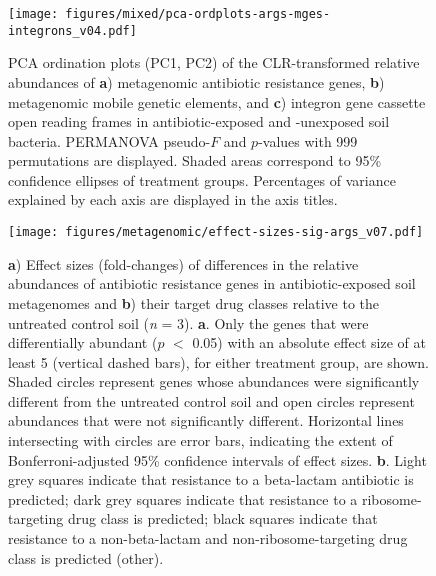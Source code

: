 \begin{figure}[htpb]
	\centering
		\texttt{[image: figures/mixed/pca-ordplots-args-mges-integrons\_v04.pdf]}
	\caption[PCA ordination plots (PC1, PC2) of the CLR-transformed relative abundances of \textbf{a}) metagenomic antibiotic resistance genes, \textbf{b}) metagenomic mobile genetic elements, and \textbf{c}) integron gene cassette open reading frames in antibiotic-exposed and -unexposed soil bacteria.]{
		PCA ordination plots (PC1, PC2) of the CLR-transformed relative abundances of \textbf{a}) metagenomic antibiotic resistance genes, \textbf{b}) metagenomic mobile genetic elements, and \textbf{c}) integron gene cassette open reading frames in antibiotic-exposed and -unexposed soil bacteria.
		PERMANOVA pseudo-$F$ and $p$-values with 999 permutations are displayed.
		Shaded areas correspond to 95\% confidence ellipses of treatment groups.
		Percentages of variance explained by each axis are displayed in the axis titles.
	}
	\label{fig:pca-ordplots-args-mges-integrons}
\end{figure}

\begin{figure}[htpb]
	\centering
		\texttt{[image: figures/metagenomic/effect-sizes-sig-args\_v07.pdf]}
	\caption[\textbf{a}) Effect sizes (fold-changes) of differences in the relative abundances of antibiotic resistance genes in antibiotic-exposed soil metagenomes and \textbf{b}) their target drug classes relative to the untreated control soil (\textit{n} = 3).]{
		\textbf{a}) Effect sizes (fold-changes) of differences in the relative abundances of antibiotic resistance genes in antibiotic-exposed soil metagenomes and \textbf{b}) their target drug classes relative to the untreated control soil (\textit{n} = 3).
		\textbf{a}. Only the genes that were differentially abundant ($p$ $<$ 0.05) with an absolute effect size of at least 5 (vertical dashed bars), for either treatment group, are shown.
		Shaded circles represent genes whose abundances were significantly different from the untreated control soil and open circles represent abundances that were not significantly different.
		Horizontal lines intersecting with circles are error bars, indicating the extent of Bonferroni-adjusted 95\% confidence intervals of effect sizes.
		\textbf{b}. Light grey squares indicate that resistance to a beta-lactam antibiotic is predicted; dark grey squares indicate that resistance to a ribosome-targeting drug class is predicted; black squares indicate that resistance to a non-beta-lactam and non-ribosome-targeting drug class is predicted (other).
	}
	\label{fig:effect-sizes-sig-args}
\end{figure}

